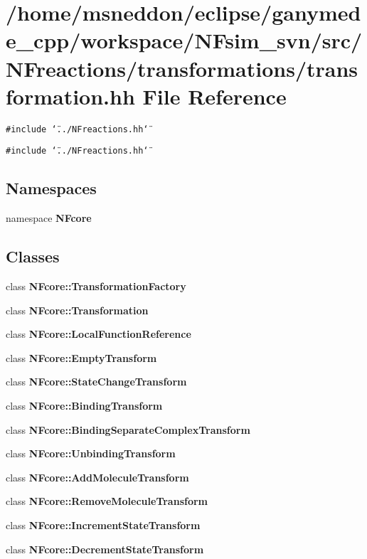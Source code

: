 \section{/home/msneddon/eclipse/ganymede\_\-cpp/workspace/NFsim\_\-svn/src/NFreactions/transformations/transformation.hh File Reference}
\label{transformation_8hh}


{\tt \#include \char`\"{}../NFreactions.hh\char`\"{}}\par
{\tt \#include \char`\"{}../NFreactions.hh\char`\"{}}\par
\subsection*{Namespaces}
\begin{CompactItemize}
\item 
namespace {\bf NFcore}
\end{CompactItemize}
\subsection*{Classes}
\begin{CompactItemize}
\item 
class {\bf NFcore::TransformationFactory}
\item 
class {\bf NFcore::Transformation}
\item 
class {\bf NFcore::LocalFunctionReference}
\item 
class {\bf NFcore::EmptyTransform}
\item 
class {\bf NFcore::StateChangeTransform}
\item 
class {\bf NFcore::BindingTransform}
\item 
class {\bf NFcore::BindingSeparateComplexTransform}
\item 
class {\bf NFcore::UnbindingTransform}
\item 
class {\bf NFcore::AddMoleculeTransform}
\item 
class {\bf NFcore::RemoveMoleculeTransform}
\item 
class {\bf NFcore::IncrementStateTransform}
\item 
class {\bf NFcore::DecrementStateTransform}
\end{CompactItemize}
